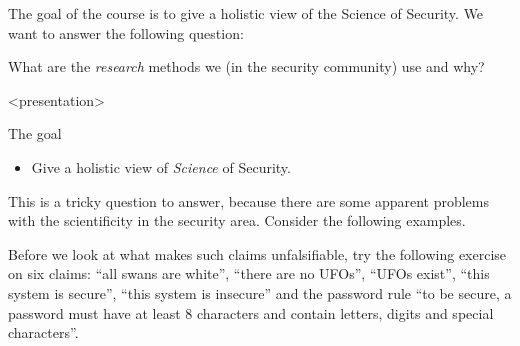 The goal of the course is to give a holistic view of the Science of Security.
We want to answer the following question:

\begin{frame}
  \begin{question}
    What are the \emph{research} methods we (in the security community) use and 
    why?
  \end{question}
\end{frame}

\begin{frame}<presentation>
  \begin{block}{The goal}
    \begin{itemize}
      \item Give a holistic view of \emph{Science} of Security.
    \end{itemize}
  \end{block}
\end{frame}

This is a tricky question to answer, because there are some apparent problems 
with the scientificity in the security area.
Consider the following examples.

\begin{frame}[fragile]
  \begin{example}\label{SoKProblem1}
  \end{example}

  \pause

  \begin{example}\label{SoKProblem2}
  \end{example}
\end{frame}

Before we look at what makes such claims unfalsifiable, try the following
exercise on six claims: \enquote{all swans are white}, \enquote{there are no
UFOs}, \enquote{UFOs exist}, \enquote{this system is secure}, \enquote{this
system is insecure} and the password rule \enquote{to be secure, a password
must have at least 8 characters and contain letters, digits and special
characters}.

